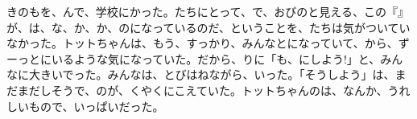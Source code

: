 {き}のもを、んで、学校にかった。たちにとって、で、おびのと見える、この『』が、は、な、か、か、のになっているのだ、ということを、たちは気がついていなかった。トットちゃんは、もう、すっかり、みんなとになっていて、から、ずーっとにいるような気になっていた。だから、りに「も、にしよう!」と、みんなに大きいでった。みんなは、とびはねながら、いった。「そうしよう」は、まだまだしそうで、のが、くやくにこえていた。トットちゃんのは、なんか、うれしいもので、いっぱいだった。


